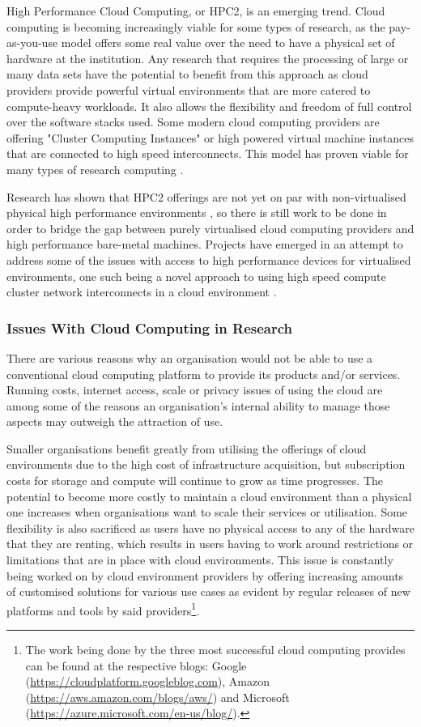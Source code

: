 High Performance Cloud Computing, or HPC2, is an emerging trend. Cloud computing is becoming increasingly viable for some types of research, as the pay-as-you-use model offers some real value over the need to have a physical set of hardware at the institution. Any research that requires the processing of large or many data sets have the potential to benefit from this approach as cloud providers provide powerful virtual environments that are more catered to compute-heavy workloads. It also allows the flexibility and freedom of full control over the software stacks used. Some modern cloud computing providers are offering "Cluster Computing Instances" or high powered virtual machine instances that are connected to high speed interconnects. This model has proven viable for many types of research computing \parencite{hazelhurst2008scientific}.

Research has shown that HPC2 offerings are not yet on par with non-virtualised physical high performance environments \parencite{jackson2010performance}, so there is still work to be done in order to bridge the gap between purely virtualised cloud computing providers and high performance bare-metal machines. Projects have emerged in an attempt to address some of the issues with access to high performance devices for virtualised environments, one such being a novel approach to using high speed compute cluster network interconnects in a cloud environment \parencite{mauch2013high}.

\subsubsection{Issues With Cloud Computing in Research}

There are various reasons why an organisation would not be able to use a conventional cloud computing platform to provide its products and/or services. Running costs, internet access, scale or privacy issues of using the cloud are among some of the reasons an organisation's internal ability to manage those aspects may outweigh the attraction of use.

Smaller organisations benefit greatly from utilising the offerings of cloud environments due to the high cost of infrastructure acquisition, but subscription costs for storage and compute will continue to grow as time progresses. The potential to become more costly to maintain a cloud environment than a physical one increases when organisations want to scale their services or utilisation. Some flexibility is also sacrificed as users have no physical access to any of the hardware that they are renting, which results in users having to work around restrictions or limitations that are in place with cloud environments. This issue is constantly being worked on by cloud environment providers by offering increasing amounts of customised solutions for various use cases as evident by regular releases of new platforms and tools by said providers\footnote{The work being done by the three most successful cloud computing provides can be found at the respective blogs: Google (\url{https://cloudplatform.googleblog.com}), Amazon (\url{https://aws.amazon.com/blogs/aws/}) and Microsoft (\url{https://azure.microsoft.com/en-us/blog/}).}.

